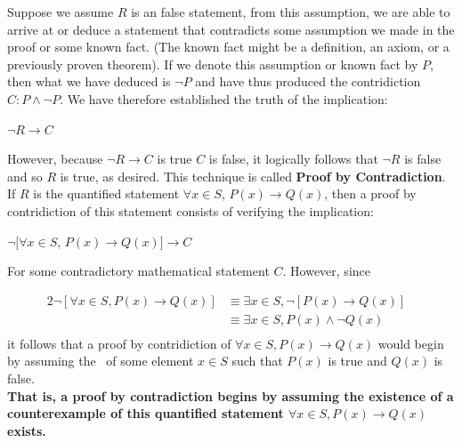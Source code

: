 \documentclass{book}
\theoremstyle{definition}
\theoremstyle{remark}
\begin{document}
Suppose we assume $R$ is an false statement, from this assumption, we are able to arrive at or deduce a statement that contradicts some assumption we made in the proof or some known fact. (The known fact might be a definition, an axiom, or a previously proven theorem). If we denote this assumption or known fact by $P$, then what we have deduced is $\neg P$ and have thus produced the contridiction $C:P \wedge \neg P$. We  have therefore established the truth of the implication: 
	\begin{center}
		$\neg R \to C$
	\end{center}	 
However, because $\neg R \to C$ is true $C$ is false, it logically follows that $\neg R$ is false and so $R$ is true, as desired. This technique is called {\bf Proof by Contradiction}.\\

If $R$ is the quantified statement $\forall x \in S$, $P(x) \to Q(x)$, then a proof by contridiction of this statement consists of verifying the implication:
	\begin{center}
		$\neg [\forall x \in S$, $P(x) \to Q(x)] \to C$
	\end{center}
For some contradictory mathematical statement $C$. However, since  

	\begin{alignat*}{2}
 		\neg [\forall x \in S, P(x) \to Q(x)]	& \equiv \exists x \in S, \neg [P(x) \to Q(x)] & \\
 		& \equiv \exists x \in S,P(x) \wedge \neg Q(x) & \\	
	\end{alignat*} 
it follows that a proof by contridiction of $\forall x \in S, P(x) \to Q(x)$ would begin by assuming the \ of some element $x \in S$ such that $P(x)$ is true and $Q(x)$ is false.\\
{\bf That is, a proof by contradiction begins by assuming the existence of a counterexample of this quantified statement $\forall x \in S, P(x) \to Q(x)$ exists.} 


\newpage
\end{document}
